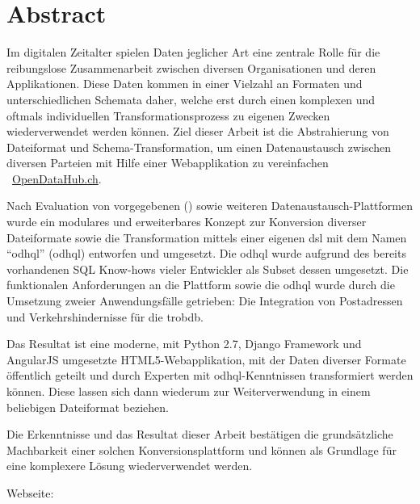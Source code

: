 \begin{comment}
2.1.2 Abstract
Ein Abstract ist eine rein textuelle kurze Zusammenfassung der Arbeit. Der Abstract ist für die Recherche in grossen Dokumentensammlungen geeignet. Er umfasst nie mehr als eine Seite, typisch sogar nur etwa 200 Worte (etwa 20 Zeilen).
Der Begriff ‚Kurzfassung’ ist zuwenig genau definiert; er soll wenn möglich vermieden werden.
\end{comment}


{}
\chapter*{Abstract}

Im digitalen Zeitalter spielen Daten jeglicher Art eine zentrale Rolle für die reibungslose Zusammenarbeit zwischen diversen Organisationen und deren Applikationen. Diese Daten kommen in einer Vielzahl an Formaten und unterschiedlichen Schemata daher, welche erst durch einen komplexen und oftmals individuellen Transformationsprozess zu eigenen Zwecken wiederverwendet werden können. Ziel dieser Arbeit ist die Abstrahierung von Dateiformat und Schema-Transformation, um einen Datenaustausch zwischen diversen Parteien mit Hilfe einer Webapplikation zu vereinfachen \textendash\ \href{http://beta.opendatahub.ch/}{OpenDataHub.ch}.

\medskip
Nach Evaluation von vorgegebenen () sowie weiteren Datenaustausch-Plattformen wurde ein modulares und erweiterbares Konzept zur Konversion diverser Dateiformate sowie die Transformation mittels einer eigenen \gls{dsl} mit dem Namen ``\acl{odhql}'' (\acs{odhql}) entworfen und umgesetzt. Die \acs{odhql} wurde aufgrund des bereits vorhandenen SQL Know-hows vieler Entwickler als Subset dessen umgesetzt. Die funktionalen Anforderungen an die Plattform sowie die \acs{odhql} wurde durch die Umsetzung zweier Anwendungsfälle getrieben: Die Integration von Postadressen und Verkehrshindernisse für die \gls{trobdb}.

\medskip
Das Resultat ist eine moderne, mit Python 2.7, Django Framework und AngularJS umgesetzte HTML5-Webapplikation, mit der Daten diverser Formate öffentlich geteilt und durch Experten mit \acs{odhql}-Kenntnissen transformiert werden können. Diese lassen sich dann wiederum zur Weiterverwendung in einem beliebigen Dateiformat beziehen.

\medskip
Die Erkenntnisse und das Resultat dieser Arbeit bestätigen die grundsätzliche Machbarkeit einer solchen Konversionsplattform und können als Grundlage für eine komplexere Lösung wiederverwendet werden.

\bigskip
Webseite: 


\glsresetall